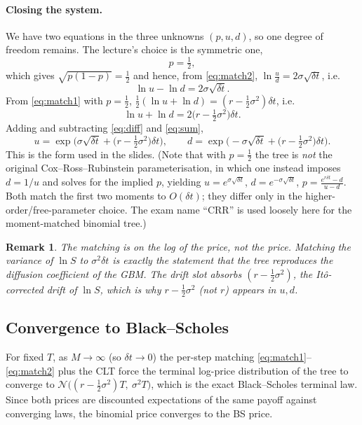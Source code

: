 \documentclass[11pt]{article}
\newtheorem{remark}{Remark}
\begin{document}
\paragraph{Closing the system.} We have two equations in the three unknowns $(p,u,d)$, so one degree of freedom remains. The lecture's choice is the symmetric one,
\begin{equation}
p=\tfrac12,
\label{eq:phalf}
\end{equation}
which gives $\sqrt{p(1-p)}=\tfrac12$ and hence, from \eqref{eq:match2}, $\ln\tfrac ud = 2\sigma\sqrt{\delta t}$, i.e.
\begin{equation}
\ln u - \ln d = 2\sigma\sqrt{\delta t}.
\label{eq:diff}
\end{equation}
From \eqref{eq:match1} with $p=\tfrac12$, $\tfrac12(\ln u + \ln d) = (r-\tfrac12\sigma^2)\delta t$, i.e.
\begin{equation}
\ln u + \ln d = 2\Big(r-\tfrac12\sigma^2\Big)\delta t.
\label{eq:sum}
\end{equation}
Adding and subtracting \eqref{eq:diff} and \eqref{eq:sum},
\begin{equation}
\boxed{\;
u = \exp\!\Big(\sigma\sqrt{\delta t} + \big(r-\tfrac12\sigma^2\big)\delta t\Big),
\qquad
d = \exp\!\Big(-\sigma\sqrt{\delta t} + \big(r-\tfrac12\sigma^2\big)\delta t\Big).\;}
\label{eq:crr}
\end{equation}
This is the form used in the slides. (Note that with $p=\tfrac12$ the tree is \emph{not} the original Cox--Ross--Rubinstein parameterisation, in which one instead imposes $d=1/u$ and solves for the implied $p$, yielding $u=e^{\sigma\sqrt{\delta t}}$, $d=e^{-\sigma\sqrt{\delta t}}$, $p=\tfrac{e^{r\delta t}-d}{u-d}$. Both match the first two moments to $O(\delta t)$; they differ only in the higher-order/free-parameter choice. The exam name ``CRR'' is used loosely here for the moment-matched binomial tree.)

\begin{remark}
The matching is on the \emph{log} of the price, not the price. Matching the variance of $\ln S$ to $\sigma^2\delta t$ is exactly the statement that the tree reproduces the diffusion coefficient of the GBM. The drift slot absorbs $(r-\tfrac12\sigma^2)$, the Itô-corrected drift of $\ln S$, which is why $r-\tfrac12\sigma^2$ (not $r$) appears in $u,d$.
\end{remark}

\subsection{Convergence to Black--Scholes}
For fixed $T$, as $M\to\infty$ (so $\delta t\to0$) the per-step matching \eqref{eq:match1}--\eqref{eq:match2} plus the CLT force the terminal log-price distribution of the tree to converge to $\mathcal N\big((r-\tfrac12\sigma^2)T,\ \sigma^2 T\big)$, which is the exact Black--Scholes terminal law. Since both prices are discounted expectations of the same payoff against converging laws, the binomial price converges to the BS price.
\end{document}
